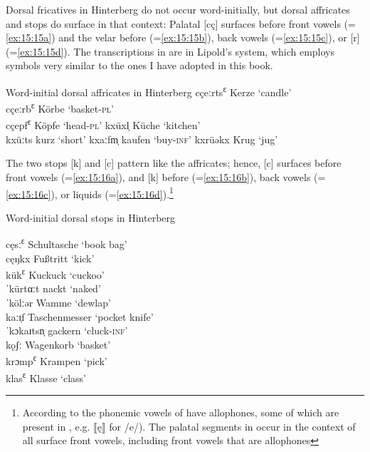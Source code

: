 {  Dorsal fricatives in Hinterberg do not occur word-initially, but dorsal affricates and stops do surface in that context: Palatal [cç] surfaces before front vowels (=\ref{ex:15:15a}) and the velar before  (=\ref{ex:15:15b}), back vowels (=\ref{ex:15:15c}), or [r] (=\ref{ex:15:15d}). The transcriptions in  are in Lipold’s system, which employs symbols very similar to the ones I have adopted in this book.

\ea%
\label{ex:15:15}Word-initial dorsal affricates in Hinterberg
\ea\label{ex:15:15a} cçeːrts\textsuperscript{ɛ} \tab Kerze \tab ‘candle’ \\
    cçeːrb\textsuperscript{ɛ} \tab Körbe \tab ‘basket-\textsc{pl}’ \\
    cçepf\textsuperscript{ɛ} \tab Köpfe \tab ‘head-\textsc{pl}’ 
\ex\label{ex:15:15b} kxüxl̩ \tab Küche \tab ‘kitchen’ \\
    kxüːts \tab kurz \tab ‘short’ 
\ex\label{ex:15:15c} kxaːfm̩ \tab kaufen \tab ‘buy-\textsc{inf}’ 
\ex\label{ex:15:15d} kxrüəkx \tab Krug \tab ‘jug’ 
\z
\z

The two stops [k] and [c] pattern like the affricates; hence, [c] surfaces before front vowels (=\ref{ex:15:16a}), and [k] before  (=\ref{ex:15:16b}), back vowels (=\ref{ex:15:16c}), or liquids (=\ref{ex:15:16d}).\footnote{{According to \citet{Lipold1984} the phonemic vowels of  have allophones, some of which are present in , e.g. ⟦ę⟧ for /e/). The palatal segments in  occur in the context of all surface front vowels, including front vowels that are allophones}}


\ea%
\label{ex:15:16}Word-initial dorsal stops in Hinterberg

\ea\label{ex:15:16a} cęsː\textsuperscript{ɛ} \tab Schultasche \tab ‘book bag’ \\
    cęŋkx \tab Fußtritt \tab ‘kick’ \\
\ex\label{ex:15:16b} kük\textsuperscript{ɛ} \tab Kuckuck \tab ‘cuckoo’ \\
    ˈkürtαːt \tab nackt \tab ‘naked’ \\
    ˈkölːər \tab Wamme \tab ‘dewlap’ \\
\ex\label{ex:15:16c} kaːɪ̜f \tab Taschenmesser \tab ‘pocket knife’ \\
    ˈkɔkaɪtsn̩ \tab gackern \tab ‘cluck-\textsc{inf}’ \\
    kǫʃː  \tab  Wagenkorb \tab ‘basket’ \\
\ex\label{ex:15:16d} krɔmp\textsuperscript{ɛ} \tab Krampen \tab ‘pick’ \\
    klas\textsuperscript{ɛ} \tab Klasse \tab ‘class’ \\
    \z
\z

}
